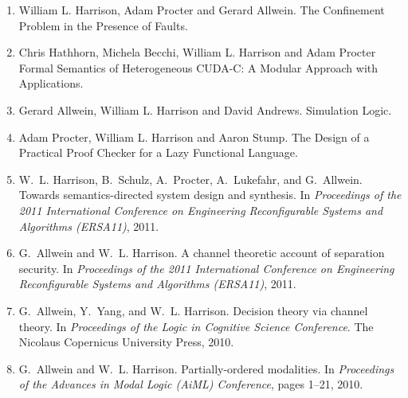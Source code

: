 \documentclass[12pt]{article} %
\begin{document}
\begin{enumerate}[leftmargin=0.0mm]
\item
   William L. Harrison, Adam Procter and Gerard Allwein.
\newblock The Confinement Problem in the Presence of Faults.
                  

\item
Chris Hathhorn, Michela Becchi, William L. Harrison and Adam Procter
\newblock Formal Semantics of Heterogeneous CUDA-C: A Modular Approach with Applications.

\item
Gerard Allwein, William L. Harrison and David Andrews.
\newblock Simulation Logic.


\item
 Adam Procter, William L. Harrison and Aaron Stump.
 \newblock The Design of a Practical Proof Checker for a Lazy Functional Language.


\item
W.~L. Harrison, B.~Schulz, A.~Procter, A.~Lukefahr, and G.~Allwein.
\newblock Towards semantics-directed system design and synthesis.
\newblock In {\em Proceedings of the 2011 International Conference on
  Engineering Reconfigurable Systems and Algorithms (ERSA11)}, 2011.

\item
G.~Allwein and W.~L. Harrison.
\newblock A channel theoretic account of separation security.
\newblock In {\em Proceedings of the 2011 International Conference on
  Engineering Reconfigurable Systems and Algorithms (ERSA11)}, 2011.



\item
G.~Allwein, Y.~Yang, and W.~L. Harrison.
\newblock Decision theory via channel theory.
\newblock In {\em Proceedings of the Logic in Cognitive Science Conference}. The Nicolaus Copernicus
  University Press, 2010.

\item
G.~Allwein and W.~L. Harrison.
\newblock Partially-ordered modalities.
\newblock In {\em Proceedings of the Advances in Modal Logic (AiML) Conference}, pages 1--21, 2010.


\end{enumerate}
\end{document}
